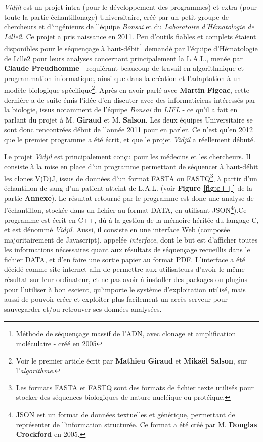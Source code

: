 \documentclass[pdftex,12pt,a4paper]{report}
\begin{document}
\begin{spacing}{1.2}
\textit{Vidjil} est un projet intra (pour le développement des programmes) et extra (pour toute la partie échantillonage) Universitaire, créé par un petit groupe de chercheurs et d'ingénieurs de l'équipe \textit{Bonsai} et du \textit{Laboratoire d'Hématologie de Lille2}.
\newline
Ce projet a pris naissance en 2011. Peu d'outils fiables et complets étaient disponibles pour le séquençage à haut-débit\footnote{Méthode de séquençage massif de l'ADN, avec clonage et amplification moléculaire - créé en 2005} demandé par l'équipe d'Hématologie de Lille2 pour leurs analyses concernant principalement la L.A.L., menée par \textbf{Claude Preudhomme} - requièrant beaucoup de travail en algorithmique et programmation informatique, ainsi que dans la création et l'adaptation à un modèle biologique spécifique\footnote{Voir le premier article écrit par \textbf{Mathieu Giraud} et \textbf{Mikaël Salson}, sur l'\textit{algorithme}.}.
Après en avoir parlé avec \textbf{Martin Figeac}, cette dernière a de suite émis l'idée d'en discuter avec des informaticiens intéressés par la biologie, issus notamment de l'équipe \textit{Bonsai} du \textit{LIFL} - ce qu'il a fait en parlant du projet à M. \textbf{Giraud} et M. \textbf{Salson}.
Les deux équipes Universitaire se sont donc rencontrées début de l'année 2011 pour en parler. Ce n'est qu'en 2012 que le premier programme a été écrit, et que le projet \textit{Vidjil} a réellement débuté.

Le projet \textit{Vidjil} est principalement conçu pour les médecins et les chercheurs.
\newline 
Il consiste à la mise en place d'un programme permettant de séquencer à haut-débit les clones V(D)J, issus de données d'un format FASTA ou FASTQ\footnote{Les formats FASTA et FASTQ sont des formats de fichier texte utilisés pour stocker des séquences biologiques de nature nucléique ou protéique.}, à partir d'un échantillon de sang d'un patient atteint de L.A.L. (voir \textbf{Figure \ref{fig:c++}} de la partie \textbf{Annexe}). Le résultat retourné par le programme est donc une analyse de l'échantillon, stockée dans un fichier au format DATA, en utilisant JSON\footnote{JSON est un format de données textuelles et générique, permettant de représenter de l'information structurée. Ce format a été créé par M. \textbf{Douglas Crockford} en 2005.}).Ce programme est écrit en C++, dû à la gestion de la mémoire héritée du langage C, et est dénommé \textit{Vidjil}. Aussi, il consiste en une interface Web (composée majoritairement de Javascript), appelée \textit{interface}, dont le but est d'afficher toutes les informations nécessaires quant aux résultats de séquençage recueillis dans le fichier DATA, et d'en faire une sortie papier au format PDF. L'interface a été décidé comme site internet afin de permettre aux utilisateurs d'avoir le même résultat sur leur ordinateur, et ne pas avoir à installer des packages ou plugins pour l'utiliser à bon escient, qu'importe le système d'exploitation utilisé, mais aussi de pouvoir créer et exploiter plus facilement un accès serveur pour sauvegarder et/ou retrouver ses données analysées.


\end{spacing}
\end{document}
